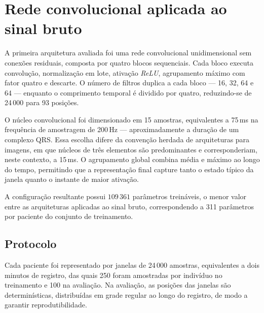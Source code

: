 %

\section{Rede convolucional aplicada ao sinal bruto}
\label{sec:resultados-cnn-simples}

A primeira arquitetura avaliada foi uma rede convolucional unidimensional sem
conexões residuais, composta por quatro blocos sequenciais. Cada bloco
executa convolução, normalização em lote, ativação \textit{ReLU}, agrupamento
máximo com fator quatro e descarte. O número de filtros duplica a cada bloco
--- 16, 32, 64 e 64 --- enquanto o comprimento temporal é dividido por
quatro, reduzindo-se de 24\,000 para 93 posições.

O núcleo convolucional foi dimensionado em 15 amostras, equivalentes a
75\,ms na frequência de amostragem de 200\,Hz --- aproximadamente a duração
de um complexo QRS. Essa escolha difere da convenção herdada de arquiteturas
para imagens, em que núcleos de três elementos são predominantes e
corresponderiam, neste contexto, a 15\,ms. O agrupamento global combina média
e máximo ao longo do tempo, permitindo que a representação final capture
tanto o estado típico da janela quanto o instante de maior ativação.

A configuração resultante possui $109\,361$ parâmetros treináveis, o menor
valor entre as arquiteturas aplicadas ao sinal bruto, correspondendo a 311
parâmetros por paciente do conjunto de treinamento.

\subsection{Protocolo}
\label{subsec:protocolo-cnn-simples}

Cada paciente foi representado por janelas de 24\,000 amostras, equivalentes
a dois minutos de registro, das quais 250 foram amostradas por indivíduo no
treinamento e 100 na avaliação. Na avaliação, as posições das janelas são
determinísticas, distribuídas em grade regular ao longo do registro, de modo
a garantir reprodutibilidade.

